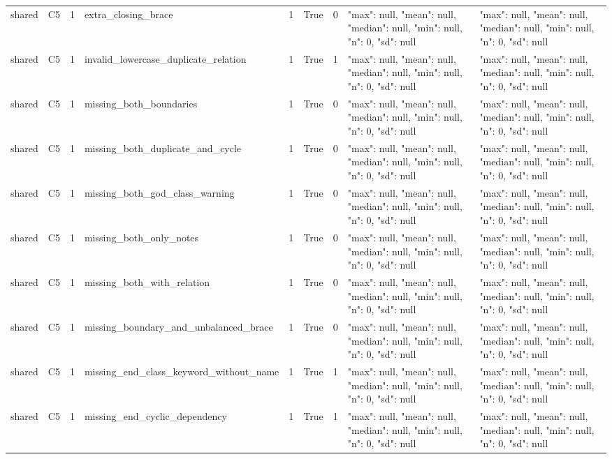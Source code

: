 \begin{tabular}{lllllllll}
shared & C5 & 1 & extra\_closing\_brace & 1 & True & 0 & {"max": null, "mean": null, "median": null, "min": null, "n": 0, "sd": null} & {"max": null, "mean": null, "median": null, "min": null, "n": 0, "sd": null} \\
shared & C5 & 1 & invalid\_lowercase\_duplicate\_relation & 1 & True & 1 & {"max": null, "mean": null, "median": null, "min": null, "n": 0, "sd": null} & {"max": null, "mean": null, "median": null, "min": null, "n": 0, "sd": null} \\
shared & C5 & 1 & missing\_both\_boundaries & 1 & True & 0 & {"max": null, "mean": null, "median": null, "min": null, "n": 0, "sd": null} & {"max": null, "mean": null, "median": null, "min": null, "n": 0, "sd": null} \\
shared & C5 & 1 & missing\_both\_duplicate\_and\_cycle & 1 & True & 0 & {"max": null, "mean": null, "median": null, "min": null, "n": 0, "sd": null} & {"max": null, "mean": null, "median": null, "min": null, "n": 0, "sd": null} \\
shared & C5 & 1 & missing\_both\_god\_class\_warning & 1 & True & 0 & {"max": null, "mean": null, "median": null, "min": null, "n": 0, "sd": null} & {"max": null, "mean": null, "median": null, "min": null, "n": 0, "sd": null} \\
shared & C5 & 1 & missing\_both\_only\_notes & 1 & True & 0 & {"max": null, "mean": null, "median": null, "min": null, "n": 0, "sd": null} & {"max": null, "mean": null, "median": null, "min": null, "n": 0, "sd": null} \\
shared & C5 & 1 & missing\_both\_with\_relation & 1 & True & 0 & {"max": null, "mean": null, "median": null, "min": null, "n": 0, "sd": null} & {"max": null, "mean": null, "median": null, "min": null, "n": 0, "sd": null} \\
shared & C5 & 1 & missing\_boundary\_and\_unbalanced\_brace & 1 & True & 0 & {"max": null, "mean": null, "median": null, "min": null, "n": 0, "sd": null} & {"max": null, "mean": null, "median": null, "min": null, "n": 0, "sd": null} \\
shared & C5 & 1 & missing\_end\_class\_keyword\_without\_name & 1 & True & 1 & {"max": null, "mean": null, "median": null, "min": null, "n": 0, "sd": null} & {"max": null, "mean": null, "median": null, "min": null, "n": 0, "sd": null} \\
shared & C5 & 1 & missing\_end\_cyclic\_dependency & 1 & True & 1 & {"max": null, "mean": null, "median": null, "min": null, "n": 0, "sd": null} & {"max": null, "mean": null, "median": null, "min": null, "n": 0, "sd": null} \\

\end{tabular}
